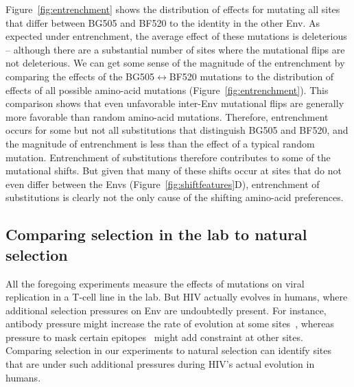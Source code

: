 \documentclass[9pt]{elife}
\begin{document}
Figure~\ref{fig:entrenchment} shows the distribution of effects for mutating all sites that differ between BG505 and BF520 to the identity in the other Env.
As expected under entrenchment, the average effect of these mutations is deleterious -- although there are a substantial number of sites where the mutational flips are not deleterious. 
We can get some sense of the magnitude of the entrenchment by comparing the effects of the BG505$\leftrightarrow$BF520 mutations to the distribution of effects of all possible amino-acid mutations (Figure~\ref{fig:entrenchment}).
This comparison shows that even unfavorable inter-Env mutational flips are generally more favorable than random amino-acid mutations.
Therefore, entrenchment occurs for some but not all substitutions that distinguish BG505 and BF520, and the magnitude of entrenchment is less than the effect of a typical random mutation.
Entrenchment of substitutions therefore contributes to some of the mutational shifts.
But given that many of these shifts occur at sites that do not even differ between the Envs (Figure~\ref{fig:shiftfeatures}D), entrenchment of substitutions is clearly not the only cause of the shifting amino-acid preferences.


\subsection{Comparing selection in the lab to natural selection}
All the foregoing experiments measure the effects of mutations on viral replication in a T-cell line in the lab.
But HIV actually evolves in humans, where additional selection pressures on Env are undoubtedly present.
For instance, antibody pressure might increase the rate of evolution at some sites~\citep{albert1990rapid,wei2003antibody,richman2003rapid}, whereas pressure to mask certain epitopes~\citep{kwong2002hiv} might add constraint at other sites. 
Comparing selection in our experiments to natural selection can identify sites that are under such additional pressures during HIV's actual evolution in humans.
\end{document}
